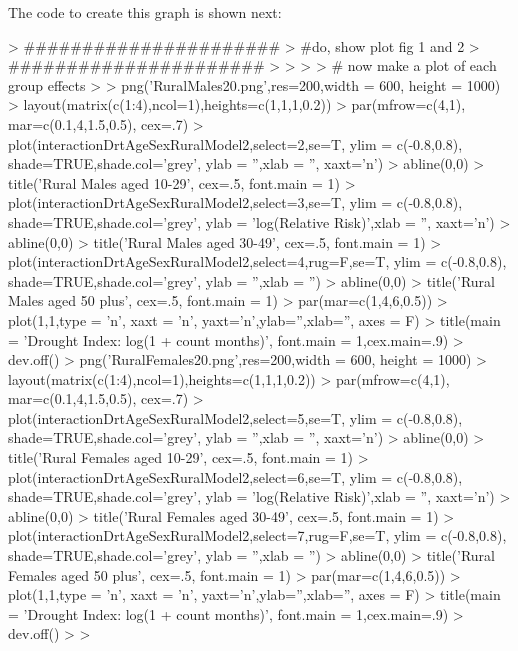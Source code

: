 \documentclass[a4paper]{article}                %
\begin{document}



        \clearpage
        The code to create this graph is shown next:

\begin{Schunk}
\begin{Sinput}
> ######################
> #do,  show plot fig 1 and 2
> ######################
> 
> 
> 
>         # now make a plot of each group effects
> 
>         png('RuralMales20.png',res=200,width = 600, height = 1000)
>         layout(matrix(c(1:4),ncol=1),heights=c(1,1,1,0.2))
>         par(mfrow=c(4,1), mar=c(0.1,4,1.5,0.5), cex=.7)
>         plot(interactionDrtAgeSexRuralModel2,select=2,se=T, ylim = c(-0.8,0.8), shade=TRUE,shade.col='grey', ylab = '',xlab = '', xaxt='n')
>         abline(0,0)
>         title('Rural Males aged 10-29', cex=.5, font.main = 1)
>         plot(interactionDrtAgeSexRuralModel2,select=3,se=T, ylim = c(-0.8,0.8), shade=TRUE,shade.col='grey', ylab = 'log(Relative Risk)',xlab = '', xaxt='n')
>         abline(0,0)
>         title('Rural Males aged 30-49', cex=.5, font.main = 1)
>         plot(interactionDrtAgeSexRuralModel2,select=4,rug=F,se=T, ylim = c(-0.8,0.8), shade=TRUE,shade.col='grey', ylab = '',xlab = '')
>         abline(0,0)
>         title('Rural Males aged 50 plus', cex=.5, font.main = 1)
>         par(mar=c(1,4,6,0.5))
>         plot(1,1,type = 'n', xaxt = 'n', yaxt='n',ylab='',xlab='', axes = F)
>         title(main = 'Drought Index: log(1 + count months)',  font.main = 1,cex.main=.9)
>         dev.off()
>         png('RuralFemales20.png',res=200,width = 600, height = 1000)
>         layout(matrix(c(1:4),ncol=1),heights=c(1,1,1,0.2))
>         par(mfrow=c(4,1), mar=c(0.1,4,1.5,0.5), cex=.7)
>         plot(interactionDrtAgeSexRuralModel2,select=5,se=T, ylim = c(-0.8,0.8), shade=TRUE,shade.col='grey', ylab = '',xlab = '', xaxt='n')
>         abline(0,0)
>         title('Rural Females aged 10-29', cex=.5, font.main = 1)
>         plot(interactionDrtAgeSexRuralModel2,select=6,se=T, ylim = c(-0.8,0.8), shade=TRUE,shade.col='grey', ylab = 'log(Relative Risk)',xlab = '', xaxt='n')
>         abline(0,0)
>         title('Rural Females aged 30-49', cex=.5, font.main = 1)
>         plot(interactionDrtAgeSexRuralModel2,select=7,rug=F,se=T, ylim = c(-0.8,0.8), shade=TRUE,shade.col='grey', ylab = '',xlab = '')
>         abline(0,0)
>         title('Rural Females aged 50 plus', cex=.5, font.main = 1)
>         par(mar=c(1,4,6,0.5))
>         plot(1,1,type = 'n', xaxt = 'n', yaxt='n',ylab='',xlab='', axes = F)
>         title(main = 'Drought Index: log(1 + count months)',  font.main = 1,cex.main=.9)
>         dev.off()
> 
> 
\end{Sinput}
\end{Schunk}

\end{document}
